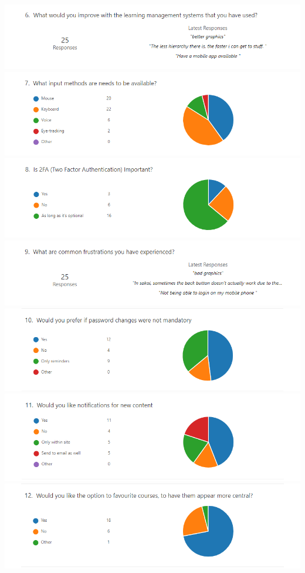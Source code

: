 \documentclass[12pt]{article}
\begin{document}
    \includegraphics[width=\textwidth]{survey/6.png}
    \includegraphics[width=\textwidth]{survey/7.png}
    \includegraphics[width=\textwidth]{survey/8.png}
    \includegraphics[width=\textwidth]{survey/9.png}
    \includegraphics[width=\textwidth]{survey/10.png}
    \includegraphics[width=\textwidth]{survey/11.png}
    \includegraphics[width=\textwidth]{survey/12.png}
\end{document}

